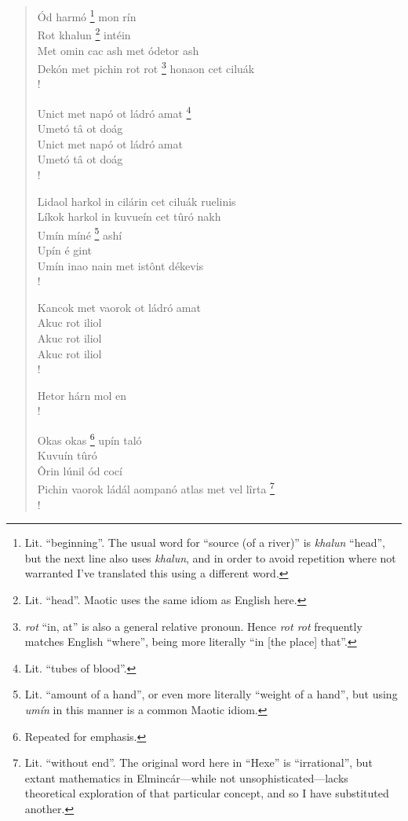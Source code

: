 \documentclass{article}
\let\oldthefootnote\thefootnote
\newcommand\oocfootnote[2][DarkGreen]{\renewcommand\thefootnote{\color{#1}\oldthefootnote}%
  \footnote{\color{#1}#2}%
  \renewcommand{\thefootnote}{\oldthefootnote}}
\begin{document}
\begin{verse}
Ód harmó\oocfootnote{Lit. ``beginning''. The usual word for ``source (of a river)'' is \emph{khalun} ``head'', but the next line also uses \emph{khalun}, and in order to avoid repetition where not warranted I've translated this using a different word.} mon rín \\
Rot khalun\oocfootnote{Lit. ``head''. Maotic uses the same idiom as English here.} intéin \\
Met omin cac ash met ódetor ash \\

Dekón met pichin rot rot\oocfootnote{\emph{rot} ``in, at'' is also a general relative pronoun. Hence \emph{rot rot} frequently matches English ``where'', being more literally ``in [the place] that''.} honaon cet ciluák \\!

Unict met napó ot ládró amat\oocfootnote{Lit. ``tubes of blood''.} \\
Umetó tâ ot doág \\
Unict met napó ot ládró amat \\
Umetó tâ ot doág \\!

Lidaol harkol in cilárin cet ciluák ruelinis \\
Líkok harkol in kuvueín cet tûró nakh \\
Umín míné\oocfootnote{Lit. ``amount of a hand'', or even more literally ``weight of a hand'', but using \emph{umín} in this manner is a common Maotic idiom.} ashí \\
Upín é gint \\
Umín inao nain met istônt dékevis \\!

Kancok met vaorok ot ládró amat \\
Akuc rot iliol \\
Akuc rot iliol \\
Akuc rot iliol \\!

Hetor hárn mol en \\!

Okas okas\oocfootnote{Repeated for emphasis.} upín taló \\
Kuvuín tûró \\
Ôrin lúnil ód cocí \\
Pichin vaorok ládál aompanó atlas met vel lîrta\oocfootnote{Lit. ``without end''. The original word here in ``Hexe'' is ``irrational'', but extant mathematics in Elmincár—while not unsophisticated—lacks theoretical exploration of that particular concept, and so I have substituted another.} \\!


\end{verse}
\end{document}
